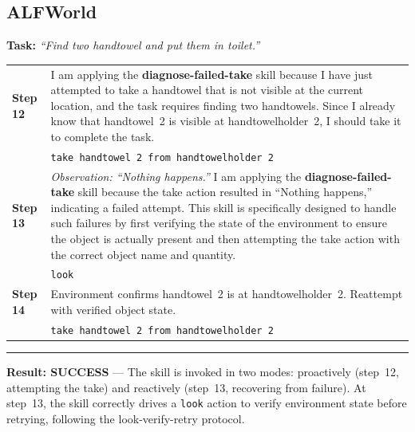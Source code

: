 \documentclass{article}
\theoremstyle{plain}
\theoremstyle{definition}
\theoremstyle{remark}
\begin{document}
\subsection{ALFWorld}

\begin{tcolorbox}[
    colback=white, colframe=stage2color, width=\textwidth, sharp corners,
    boxrule=0.8pt, left=5pt, right=5pt, top=5pt, bottom=5pt,
    title=\textbf{Case 5 (Stage 2, Step 121): Error Recovery --- diagnose-failed-take},
    fonttitle=\sffamily\small, colbacktitle=stage2color!10, coltitle=black
]
\small

\textbf{Task:} \textit{``Find two handtowel and put them in toilet.''}

\vspace{4pt}
\begin{tabularx}{\linewidth}{@{}p{1.0cm} X@{}}
    \textbf{Step 12} & I am applying the \textbf{\textcolor{skillcolor}{diagnose-failed-take}} skill because I have just attempted to take a handtowel that is not visible at the current location, and the task requires finding two handtowels. Since I already know that handtowel~2 is visible at handtowelholder~2, I should take it to complete the task. \\
    & \texttt{take handtowel 2 from handtowelholder 2} \\
    \midrule
    \textbf{Step 13} & \textit{Observation: ``Nothing happens.''} I am applying the \textbf{\textcolor{skillcolor}{diagnose-failed-take}} skill because the take action resulted in ``Nothing happens,'' indicating a failed attempt. This skill is specifically designed to handle such failures by first verifying the state of the environment to ensure the object is actually present and then attempting the take action with the correct object name and quantity. \\
    & \texttt{look} \\
    \midrule
    \textbf{Step 14} & Environment confirms handtowel~2 is at handtowelholder~2. Reattempt with verified object state. \\
    & \texttt{take handtowel 2 from handtowelholder 2} \\
\end{tabularx}

\vspace{3pt}\hrule\vspace{3pt}
\textbf{\textcolor{successgreen}{Result: SUCCESS}} --- The skill is invoked in two modes: proactively (step~12, attempting the take) and reactively (step~13, recovering from failure). At step~13, the skill correctly drives a \texttt{look} action to verify environment state before retrying, following the look-verify-retry protocol.
\end{tcolorbox}
\end{document}
